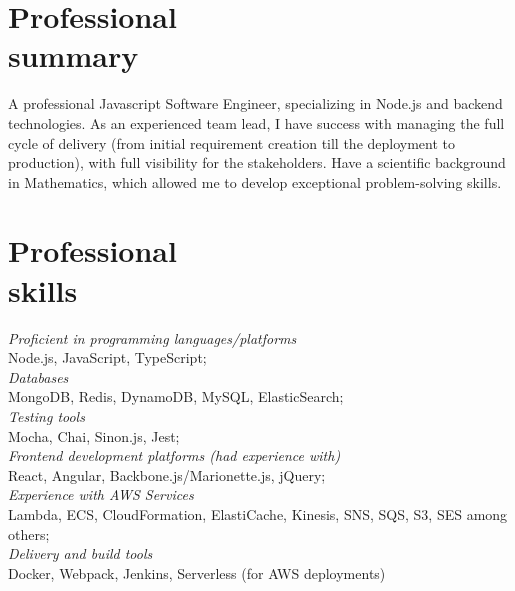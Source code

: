 \documentclass[margin, 10pt]{res} %
\begin{document}
\begin{resume}
\vspace*{-0.5cm}
\section{Professional\\ summary}
A professional Javascript Software Engineer, specializing in Node.js and backend technologies.
As an experienced team lead, I have success with managing the full cycle of delivery (from initial requirement creation till the deployment to production), with full visibility for the stakeholders.
Have a scientific background in Mathematics, which allowed me to develop exceptional problem-solving skills.

\section{Professional\\ skills}
{\sl  Proficient in programming languages/platforms}  \\
\-\hspace{0.5cm} Node.js, JavaScript, TypeScript;\\
{\sl Databases }\\
\-\hspace{0.5cm} MongoDB, Redis, DynamoDB, MySQL, ElasticSearch; \\
{\sl Testing tools }\\
\-\hspace{0.5cm} Mocha, Chai, Sinon.js, Jest; \\
{\sl Frontend development platforms (had experience with) }\\
\-\hspace{0.5cm} React, Angular,  Backbone.js/Marionette.js, jQuery;\\
{\sl Experience with AWS Services } \\
\-\hspace{0.5cm}  Lambda, ECS, CloudFormation, ElastiCache, Kinesis, SNS, SQS, S3, SES among others; \\
{\sl Delivery and build tools } \\
\-\hspace{0.5cm} Docker, Webpack, Jenkins, Serverless (for AWS deployments)


\end{resume}
\end{document}

